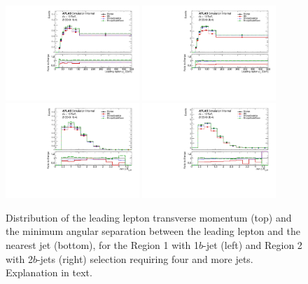 \begin{figure}[!htb]
\centering
\includegraphics[width=0.45\textwidth]{Plots/ttV/generator/c_Region_0_lep_Pt_0}
\includegraphics[width=0.45\textwidth]{Plots/ttV/generator/c_Region_1_lep_Pt_0}\\
\includegraphics[width=0.45\textwidth]{Plots/ttV/generator/c_Region_0_min_DRl0j}
\includegraphics[width=0.45\textwidth]{Plots/ttV/generator/c_Region_1_min_DRl0j}\\
  \caption{Distribution of the leading lepton transverse momentum (top) and the minimum angular separation between the leading lepton and the nearest jet (bottom), for the Region 1 with 1$b$-jet (left) and Region 2 with 2$b$-jets (right) selection requiring four and more jets. Explanation in text.
  \label{ttV:lep_kin}}
\end{figure}

